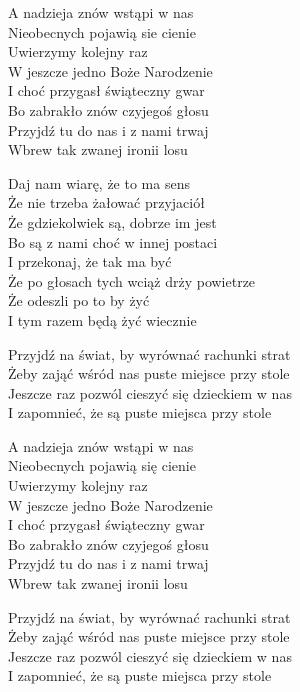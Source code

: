 \begin{text}
    A nadzieja znów wstąpi w nas\\
    Nieobecnych pojawią sie cienie\\
    Uwierzymy kolejny raz\\
    W jeszcze jedno Boże Narodzenie\\
    I choć przygasł świąteczny gwar\\
    Bo zabrakło znów czyjegoś głosu\\
    Przyjdź tu do nas i z nami trwaj\\
    Wbrew tak zwanej ironii losu
	
	Daj nam wiarę, że to ma sens\\
    Że nie trzeba żałować przyjaciół\\
    Że gdziekolwiek są, dobrze im jest\\
    Bo są z nami choć w innej postaci\\
    I przekonaj, że tak ma być\\
    Że po głosach tych wciąż drży powietrze\\
    Że odeszli po to by żyć\\
    I tym razem będą żyć wiecznie

    \vin Przyjdź na świat, by wyrównać rachunki strat\\
    \vin Żeby zająć wśród nas puste miejsce przy stole\\
    \vin Jeszcze raz pozwól cieszyć się dzieckiem w nas\\
    \vin I zapomnieć, że są puste miejsca przy stole

    A nadzieja znów wstąpi w nas\\
    Nieobecnych pojawią się cienie\\
    Uwierzymy kolejny raz\\
    W jeszcze jedno Boże Narodzenie\\
    I choć przygasł świąteczny gwar\\
    Bo zabrakło znów czyjegoś głosu\\
    Przyjdź tu do nas i z nami trwaj\\
    Wbrew tak zwanej ironii losu

    \vin Przyjdź na świat, by wyrównać rachunki strat\\
    \vin Żeby zająć wśród nas puste miejsce przy stole\\
    \vin Jeszcze raz pozwól cieszyć się dzieckiem w nas\\
    \vin I zapomnieć, że są puste miejsca przy stole
\end{text}
